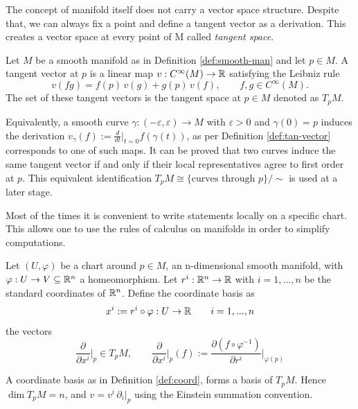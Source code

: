 The concept of manifold itself does not carry a vector space structure. Despite that, we can always fix a point and define a tangent vector as a derivation. This creates a vector space at every point of M called \textit{tangent space}.

\begin{definition}\label{def:tan-vector}
	Let $M$ be a smooth manifold as in Definition \ref{def:smooth-man} and let $p \in M$. A tangent vector at $p$ is a linear map $v : C^\infty(M) \to \mathbb{R}$ satisfying the Leibniz rule
	\[
	v(fg) = f(p)\,v(g) + g(p)\,v(f), \qquad f,g \in C^\infty(M).
	\]
	The set of these tangent vectors is the tangent space at $p \in M$ denoted as $T_pM$.
\end{definition}

\begin{remark}\label{remark:vec-der}
	Equivalently, a smooth curve $\gamma:(-\varepsilon,\varepsilon)\to M$ with $\varepsilon > 0$ and $\gamma(0)=p$ induces the derivation $v_\gamma(f) := \frac{d}{dt}\Big|_{t=0} f(\gamma(t))$, as per Definition \ref{def:tan-vector} corresponds to one of such maps. It can be proved that two curves induce the same tangent vector if and only if their local representatives agree to first order at $p$. This equivalent identification $T_pM \cong \{\text{curves through } p\}/\!\sim$ is used at a later stage.
\end{remark}

Most of the times it is convenient to write statements locally on a specific chart. This allows one to use the rules of calculus on manifolds in order to simplify computations.

\begin{definition}\label{def:coord}
	Let $(U,\varphi)$ be a chart around $p \in M$, an n-dimensional smooth manifold, with $\varphi : U \to V \subseteq \mathbb{R}^n$ a homeomorphism. Let $r^i : \mathbb{R}^n \to \mathbb{R}$ with $i=1,...,n$ be the standard coordinates of $\mathbb{R}^n$. Define the coordinate basis as
	\[
		x^i := r^i \circ \varphi : U \to \mathbb{R} \qquad i = 1,...,n
	\]
	the vectors
	\[
	\frac{\partial}{\partial x^i}\bigg|_p \in T_pM, \qquad
	\frac{\partial}{\partial x^i}\bigg|_p(f) := \frac{\partial (f\circ\varphi^{-1})}{\partial r^i}\bigg|_{\varphi(p)}
	\]
\end{definition}

\begin{proposition}
	A coordinate basis as in Definition \ref{def:coord}, forms a basis of $T_pM$. Hence $\dim T_pM = n$, and $v = v^i\, \partial_i |_p$ using the Einstein summation convention.
\end{proposition}

